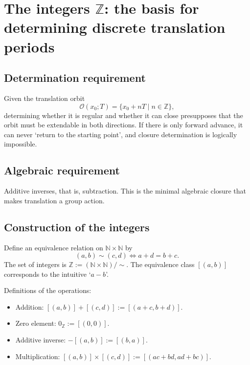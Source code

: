 \section{\texorpdfstring{The integers $\mathbb{Z}$: the basis for determining discrete translation periods}{The integers Z: the basis for determining discrete translation periods}}

\subsection{\texorpdfstring{Determination requirement}{Determination requirement}}

Given the translation orbit
\[
\mathcal{O}(x_0; T) = \{x_0 + nT \mid n \in \mathbb{Z}\},
\]
determining whether it is regular and whether it can close presupposes that the orbit must be extendable in both directions. If there is only forward advance, it can never `return to the starting point', and closure determination is logically impossible.

\subsection{\texorpdfstring{Algebraic requirement}{Algebraic requirement}}

Additive inverses, that is, subtraction. This is the minimal algebraic closure that makes translation a group action.

\subsection{\texorpdfstring{Construction of the integers}{Construction of the integers}}

\begin{definition}\label{def:integer_construction}
Define an equivalence relation on $\mathbb{N} \times \mathbb{N}$ by
\[
(a,b) \sim (c,d) \iff a + d = b + c.
\]
The set of integers is $\mathbb{Z} := (\mathbb{N} \times \mathbb{N}) / \sim$. The equivalence class $[(a,b)]$ corresponds to the intuitive `$a - b$'.

Definitions of the operations:
\begin{itemize}
    \item Addition: $[(a,b)] + [(c,d)] := [(a+c, b+d)]$.
    \item Zero element: $0_{\mathbb{Z}} := [(0,0)]$.
    \item Additive inverse: $-[(a,b)] := [(b,a)]$.
    \item Multiplication: $[(a,b)] \times [(c,d)] := [(ac+bd, ad+bc)]$.
\end{itemize}
\end{definition}

